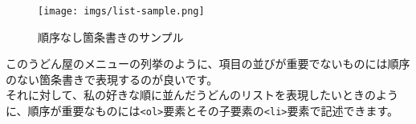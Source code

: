\begin{Shaded}
\begin{Highlighting}[]
\DataTypeTok{\textless{}}\DataTypeTok{\textgreater{}}
  \DataTypeTok{\textless{}}\DataTypeTok{\textgreater{}}\DataTypeTok{\textless{}/}\DataTypeTok{\textgreater{}}
  \DataTypeTok{\textless{}}\DataTypeTok{\textgreater{}}\DataTypeTok{\textless{}/}\DataTypeTok{\textgreater{}}
  \DataTypeTok{\textless{}}\DataTypeTok{\textgreater{}}\DataTypeTok{\textless{}/}\DataTypeTok{\textgreater{}}
  \DataTypeTok{\textless{}}\DataTypeTok{\textgreater{}}\DataTypeTok{\textless{}/}\DataTypeTok{\textgreater{}}
  \DataTypeTok{\textless{}}\DataTypeTok{\textgreater{}}\DataTypeTok{\textless{}/}\DataTypeTok{\textgreater{}}
  \DataTypeTok{\textless{}}\DataTypeTok{\textgreater{}}\DataTypeTok{\textless{}/}\DataTypeTok{\textgreater{}}
  \DataTypeTok{\textless{}}\DataTypeTok{\textgreater{}}\DataTypeTok{\textless{}/}\DataTypeTok{\textgreater{}}
  \DataTypeTok{\textless{}}\DataTypeTok{\textgreater{}}\DataTypeTok{\textless{}/}\DataTypeTok{\textgreater{}}
\DataTypeTok{\textless{}/}\DataTypeTok{\textgreater{}}
\end{Highlighting}
\end{Shaded}

\begin{figure}
\centering
\texttt{[image: imgs/list-sample.png]}
\caption{順序なし箇条書きのサンプル}
\end{figure}

このうどん屋のメニューの列挙のように、項目の並びが重要でないものには順序のない箇条書きで表現するのが良いです。\\
それに対して、私の好きな順に並んだうどんのリストを表現したいときのように、順序が重要なものには\texttt{\textless{}ol\textgreater{}}要素とその子要素の\texttt{\textless{}li\textgreater{}}要素で記述できます。

